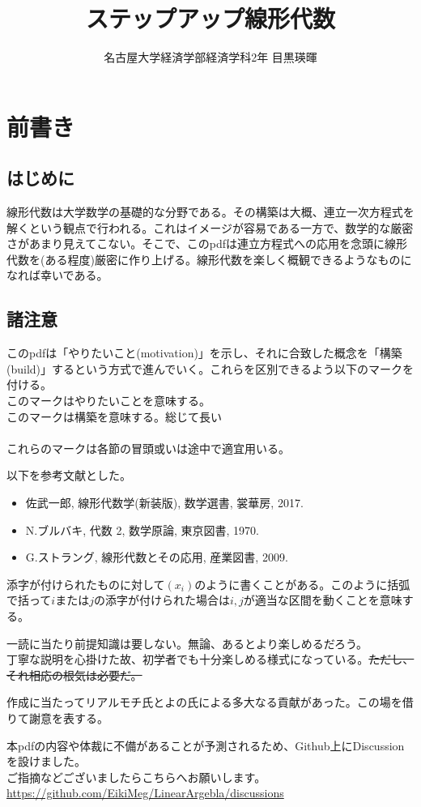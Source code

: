 \documentclass[dvipdfmx]{jsarticle}
\title{ステップアップ線形代数}
\author{名古屋大学経済学部経済学科2年 目黒瑛暉}
\begin{document}
\maketitle
\tableofcontents
\newpage

\section{前書き}

\subsection{はじめに}
線形代数は大学数学の基礎的な分野である。その構築は大概、連立一次方程式を解くという観点で行われる。これはイメージが容易である一方で、数学的な厳密さがあまり見えてこない。そこで、このpdfは連立方程式への応用を念頭に線形代数を(ある程度)厳密に作り上げる。線形代数を楽しく概観できるようなものになれば幸いである。

\subsection{諸注意}
このpdfは「やりたいこと(motivation)」を示し、それに合致した概念を「構築(build)」するという方式で進んでいく。これらを区別できるよう以下のマークを付ける。
\\
\motiv このマークはやりたいことを意味する。\\
\build このマークは構築を意味する。{\scriptsize 総じて長い}\\~\\
これらのマークは各節の冒頭或いは途中で適宜用いる。\\\par
以下を参考文献とした。
\begin{itemize}
\item 佐武一郎, 線形代数学(新装版), 数学選書, 裳華房, 2017.
\item N.ブルバキ, 代数 2, 数学原論, 東京図書, 1970.
\item G.ストラング, 線形代数とその応用, 産業図書, 2009.
\end{itemize}\par
添字が付けられたものに対して$(x_i)$のように書くことがある。このように括弧で括って$i$または$j$の添字が付けられた場合は$i,j$が適当な区間を動くことを意味する。\\\par
一読に当たり前提知識は要しない。無論、あるとより楽しめるだろう。\\
丁寧な説明を心掛けた故、初学者でも十分楽しめる様式になっている。\sout{ただし、それ相応の根気は必要だ。}\\\par
作成に当たってリアルモチ氏とよの氏による多大なる貢献があった。この場を借りて謝意を表する。\\\par
本pdfの内容や体裁に不備があることが予測されるため、Github上にDiscussionを設けました。\\
ご指摘などございましたらこちらへお願いします。{\scriptsize \url{https://github.com/EikiMeg/LinearArgebla/discussions}}
\newpage
\end{document}
